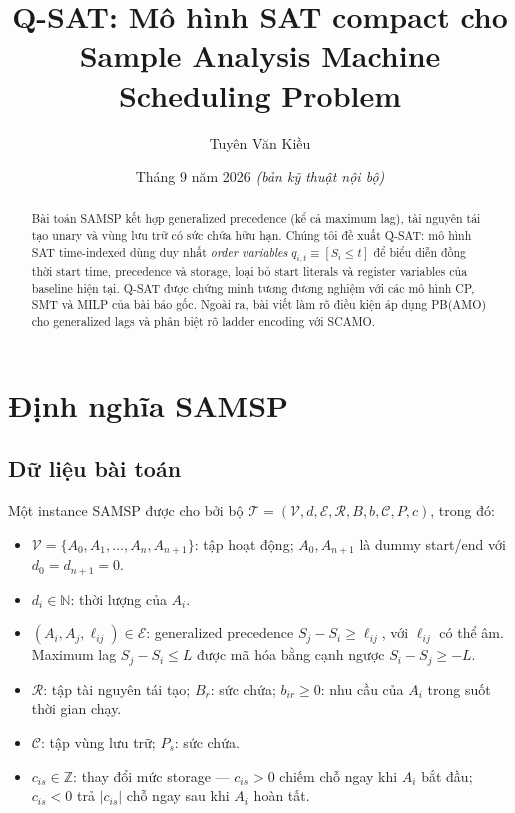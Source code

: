 \documentclass[11pt,a4paper]{article}
\theoremstyle{remark}
\begin{document}
\title{\textbf{Q-SAT: Mô hình SAT compact cho\\
    Sample Analysis Machine Scheduling Problem}}
\author{Tuyên Văn Kiều}
\date{Tháng 9 năm 2026 \quad\emph{(bản kỹ thuật nội bộ)}}
\maketitle

\begin{abstract}
Bài toán SAMSP kết hợp generalized precedence (kể cả maximum lag), tài
nguyên tái tạo unary và vùng lưu trữ có sức chứa hữu hạn.
Chúng tôi đề xuất Q-SAT: mô hình SAT time-indexed dùng duy nhất
\emph{order variables} $q_{i,t} \equiv [S_i \le t]$ để biểu diễn đồng thời
start time, precedence và storage, loại bỏ start literals và register variables
của baseline hiện tại.
Q-SAT được chứng minh tương đương nghiệm với các mô hình CP, SMT và MILP
của bài báo gốc.
Ngoài ra, bài viết làm rõ điều kiện áp dụng PB(AMO) cho generalized lags
và phân biệt rõ ladder encoding với SCAMO.
\end{abstract}

\tableofcontents
\clearpage

\section{Định nghĩa SAMSP}
\label{sec:samsp}

\subsection{Dữ liệu bài toán}

Một instance SAMSP được cho bởi bộ
$\mathcal{T} = (\mathcal{V}, d, \mathcal{E}, \mathcal{R}, B, b, \mathcal{C}, P, c)$,
trong đó:

\begin{itemize}
  \item $\mathcal{V} = \{A_0, A_1, \ldots, A_n, A_{n+1}\}$: tập hoạt động;
    $A_0, A_{n+1}$ là dummy start/end với $d_0 = d_{n+1} = 0$.
  \item $d_i \in \mathbb{N}$: thời lượng của $A_i$.
  \item $(A_i, A_j, \ell_{ij}) \in \mathcal{E}$: generalized precedence
    $S_j - S_i \ge \ell_{ij}$, với $\ell_{ij}$ có thể âm.
    Maximum lag $S_j - S_i \le L$ được mã hóa bằng cạnh ngược
    $S_i - S_j \ge -L$.
  \item $\mathcal{R}$: tập tài nguyên tái tạo; $B_r$: sức chứa;
    $b_{ir} \ge 0$: nhu cầu của $A_i$ trong suốt thời gian chạy.
  \item $\mathcal{C}$: tập vùng lưu trữ; $P_s$: sức chứa.
  \item $c_{is} \in \mathbb{Z}$: thay đổi mức storage ---
    $c_{is} > 0$ chiếm chỗ ngay khi $A_i$ bắt đầu;
    $c_{is} < 0$ trả $|c_{is}|$ chỗ ngay sau khi $A_i$ hoàn tất.
\end{itemize}
\end{document}
